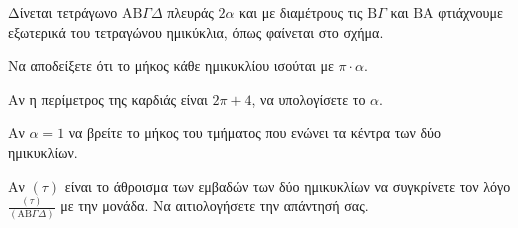 Δίνεται τετράγωνο $\mathrm{A}\mathrm{B}\Gamma\Delta$ πλευράς $2\alpha$ και με διαμέτρους τις $\mathrm{B}\Gamma$ και $\mathrm{B}\mathrm{A}$ φτιάχνουμε εξωτερικά του τετραγώνου ημικύκλια, όπως φαίνεται στο σχήμα.
\begin{alist}
\item Να αποδείξετε ότι το μήκος κάθε ημικυκλίου ισούται με $\pi\cdot\alpha$. 
\item
    \begin{rlist}
    \item Αν η περίμετρος της καρδιάς είναι $2\pi+4$, να υπολογίσετε το $\alpha$. 
    \item Αν $\alpha = 1$ να βρείτε το μήκος του τμήματος που ενώνει τα κέντρα των δύο ημικυκλίων. 
    \end{rlist}
\item Αν $(\tau)$ είναι το άθροισμα των εμβαδών των δύο ημικυκλίων να συγκρίνετε τον λόγο $\frac{(\tau)}{(\mathrm{A}\mathrm{B}\Gamma\Delta)}$ με την μονάδα. Να αιτιολογήσετε την απάντησή σας. 
\end{alist}